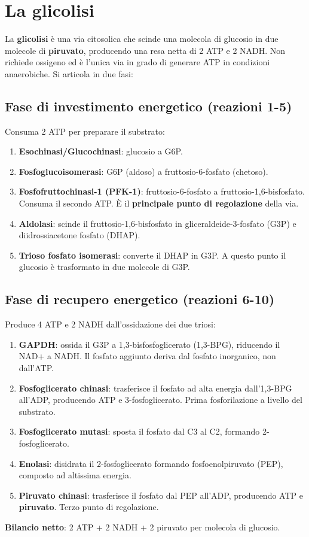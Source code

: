 \documentclass[12pt,a4paper]{report}
\begin{document}
\section{La glicolisi}
La \textbf{glicolisi} è una via citosolica che scinde una molecola di glucosio in due molecole di \textbf{piruvato}, producendo una resa netta di 2 ATP e 2 NADH. Non richiede ossigeno ed è l'unica via in grado di generare ATP in condizioni anaerobiche. Si articola in due fasi:
\subsection{Fase di investimento energetico (reazioni 1-5)}
Consuma 2 ATP per preparare il substrato:
\begin{enumerate}
\item \textbf{Esochinasi/Glucochinasi}: glucosio a G6P.
\item \textbf{Fosfoglucoisomerasi}: G6P (aldoso) a fruttosio-6-fosfato (chetoso).
\item \textbf{Fosfofruttochinasi-1 (PFK-1)}: fruttosio-6-fosfato a fruttosio-1,6-bisfosfato. Consuma il secondo ATP. È il \textbf{principale punto di regolazione} della via.
\item \textbf{Aldolasi}: scinde il fruttosio-1,6-bisfosfato in gliceraldeide-3-fosfato (G3P) e diidrossiacetone fosfato (DHAP).
\item \textbf{Trioso fosfato isomerasi}: converte il DHAP in G3P. A questo punto il glucosio è trasformato in due molecole di G3P.
\end{enumerate}
\subsection{Fase di recupero energetico (reazioni 6-10)}
Produce 4 ATP e 2 NADH dall'ossidazione dei due triosi:
\begin{enumerate}[start=6]
\item \textbf{GAPDH}: ossida il G3P a 1,3-bisfosfoglicerato (1,3-BPG), riducendo il NAD+ a NADH. Il fosfato aggiunto deriva dal fosfato inorganico, non dall'ATP.
\item \textbf{Fosfoglicerato chinasi}: trasferisce il fosfato ad alta energia dall'1,3-BPG all'ADP, producendo ATP e 3-fosfoglicerato. Prima fosforilazione a livello del substrato.
\item \textbf{Fosfoglicerato mutasi}: sposta il fosfato dal C3 al C2, formando 2-fosfoglicerato.
\item \textbf{Enolasi}: disidrata il 2-fosfoglicerato formando fosfoenolpiruvato (PEP), composto ad altissima energia.
\item \textbf{Piruvato chinasi}: trasferisce il fosfato dal PEP all'ADP, producendo ATP e \textbf{piruvato}. Terzo punto di regolazione.
\end{enumerate}
\textbf{Bilancio netto}: 2 ATP + 2 NADH + 2 piruvato per molecola di glucosio.
\end{document}
